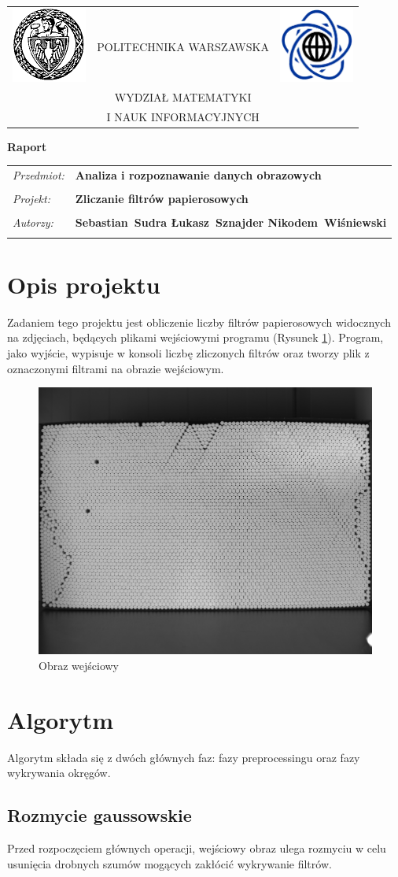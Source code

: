 \documentclass[12pt]{article}
\renewcommand{\maketitle}{
\begin{titlepage}
\begin{table}[t]
\centering
\begin{tabular}[t]{lcr}
 \includegraphics[width=70pt,height=70pt]{PW} & POLITECHNIKA WARSZAWSKA & \includegraphics[width=70pt,height=70pt]{MiNI}\\
& WYDZIAŁ MATEMATYKI & \\
& I NAUK INFORMACYJNYCH &
\end{tabular}
\end{table}
\vspace*{3cm}
  \begin{center}
    \LARGE
    \textbf {Raport}\\
   \vspace*{2 cm}
\begin{table}[!htp]
\begin{tabular}{p{4cm}p{10cm}}
\textit{Przedmiot:} &\textbf {Analiza i rozpoznawanie danych obrazowych} \\
\\
\textit{Projekt:} &\textbf {Zliczanie filtrów papierosowych} \\
\\
\textit{Autorzy:} &\textbf {Sebastian~Sudra \newline Łukasz~Sznajder \newline Nikodem~Wiśniewski} \\
\\
\end{tabular}
\end{table}

\vspace{5 cm}
  \center{\small Warszawa, dnia \today}
\end{center}
\end{titlepage}
}
\begin{document}
\maketitle

\newpage

\section{Opis projektu}
Zadaniem tego projektu jest obliczenie liczby filtrów papierosowych widocznych na zdjęciach, będących plikami wejściowymi programu (Rysunek \ref{input}). Program, jako wyjście, wypisuje w konsoli liczbę zliczonych filtrów oraz tworzy plik z oznaczonymi filtrami na obrazie wejściowym.


\begin{figure}[H]
\centering \includegraphics[scale=0.3]{1.png}
\caption{Obraz wejściowy}
\label{input}
\end{figure}

\section{Algorytm}
Algorytm składa się z dwóch głównych faz: fazy preprocessingu oraz fazy wykrywania okręgów.

\subsection{Rozmycie gaussowskie}
Przed rozpoczęciem głównych operacji, wejściowy obraz ulega rozmyciu w celu usunięcia drobnych szumów mogących zakłócić wykrywanie filtrów.
\end{document}
